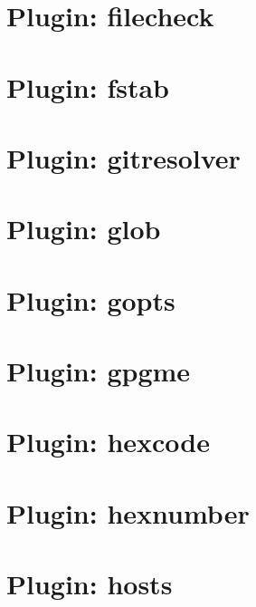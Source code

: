 \let\mypdfximage\pdfximage\def\pdfximage{\immediate\mypdfximage}\documentclass[twoside]{book}
\newcommand{\+}{\discretionary{\mbox{\scriptsize$\hookleftarrow$}}{}{}}
\begin{document}
\chapter{Plugin\+: filecheck}
\label{md_src_plugins_filecheck_README}

\chapter{Plugin\+: fstab}
\label{md_src_plugins_fstab_README}

\chapter{Plugin\+: gitresolver}
\label{md_src_plugins_gitresolver_README}

\chapter{Plugin\+: glob}
\label{md_src_plugins_glob_README}

\chapter{Plugin\+: gopts}
\label{md_src_plugins_gopts_README}

\chapter{Plugin\+: gpgme}
\label{md_src_plugins_gpgme_README}

\chapter{Plugin\+: hexcode}
\label{md_src_plugins_hexcode_README}

\chapter{Plugin\+: hexnumber}
\label{md_src_plugins_hexnumber_README}

\chapter{Plugin\+: hosts}
\label{md_src_plugins_hosts_README}

\end{document}
